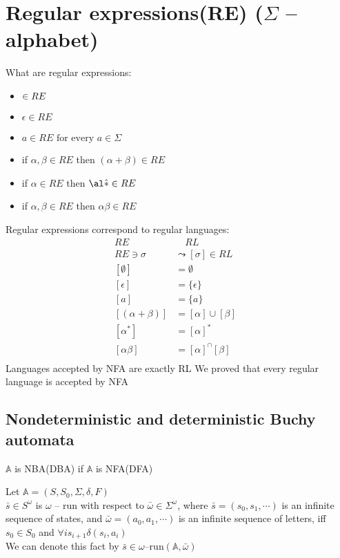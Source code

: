 
\chapter{Regular expressions(RE) ($\Sigma$ -- alphabet)}
What are regular expressions:
\begin{itemize}
        \item $\empty \in RE$
        \item  $\epsilon \in RE$ 
        \item $ a \in RE \text{ for every } a\in \Sigma$
        \item  if $\alpha, \beta \in RE$ then  $(\alpha + \beta) \in RE$
        \item if  $\alpha \in RE$ then  $\al\hat{*} \in RE$
        \item if $\alpha, \beta \in RE$ then  $\alpha \beta \in RE$
        
\end{itemize}
Regular expressions correspond to regular languages:
\begin{equation}
    \begin{aligned}
        RE & \quad RL \\
        RE \ni \sigma &\leadsto [\sigma]\in RL \\
        [\emptyset] &=\emptyset\\
        [\epsilon] &= \{\epsilon\}\\
        [a] &= \{a\}\\
        [(\alpha+\beta)]&=[\alpha]\cup [\beta]&\mbox{}\\[1.25ex]
        [\alpha^{*}]&=[\alpha]^{*}&\mbox{}\\[1.25ex]
        [\alpha \beta]&=[\alpha]^{\cap}[\beta]&\mbox{}\\[1.25ex]
    \end{aligned}
\end{equation}
\thm{}
{
    Languages accepted by NFA are exactly RL
}
\nt
{
    We proved that every regular language is accepted by NFA
}

\section{Nondeterministic and deterministic Buchy automata}

\dfn{}
{
    $\mathbb{A}$ is NBA(DBA) if $\mathbb{A}$ is NFA(DFA)
}

\dfn{}
{
    Let $\mathbb{A} = (S,S_0,\Sigma,\delta,F)$ \\
    $\bar{s} \in S^{\omega}$ is $\omega$ -- run with respect to $\bar{\omega} \in \Sigma^{\omega}$,
    where $\bar{s} = (s_0,s_1,\cdots )$ is an infinite sequence of states, and  $\bar{\omega}= (a_0,a_1,\cdots )$ is an infinite sequence of letters,
    iff $s_0 \in S_0$ and $\forall i s_{i+1} \delta (s_i,a_i)$\\
    We can denote this fact by $\bar{s} \in \omega\text{--run}(\mathbb{A},\bar{\omega})$
}

